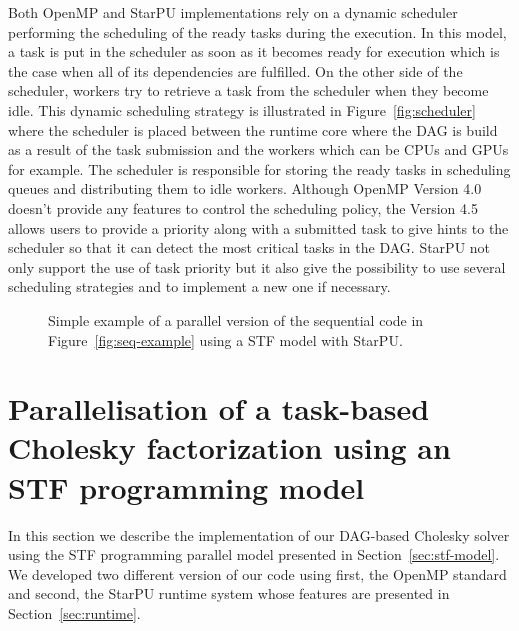\documentclass{article}
\newcommand{\starpu}{{StarPU}\xspace}
\newcommand{\openmp}{OpenMP\xspace}
\begin{document}
Both \openmp and \starpu implementations rely on a dynamic scheduler
performing the scheduling of the ready tasks during the execution. In
this model, a task is put in the scheduler as soon as it becomes ready
for execution which is the case when all of its dependencies are
fulfilled. On the other side of the scheduler, workers try to retrieve
a task from the scheduler when they become idle. This dynamic
scheduling strategy is illustrated in Figure~\ref{fig:scheduler} where
the scheduler is placed between the runtime core where the DAG is
build as a result of the task submission and the workers which can be
CPUs and GPUs for example. The scheduler is responsible for storing
the ready tasks in scheduling queues and distributing them to idle
workers. Although \openmp Version 4.0 doesn't provide any features to
control the scheduling policy, the Version 4.5 allows users to provide
a priority along with a submitted task to give hints to the scheduler
so that it can detect the most critical tasks in the DAG. \starpu not
only support the use of task priority but it also give the possibility
to use several scheduling strategies and to implement a new one if
necessary.

\begin{figure}[!h]
  \centering 
  \caption{\label{fig:stf-starpu-example}Simple example of a parallel version
    of the sequential code in Figure~\ref{fig:seq-example} using a STF
    model with \starpu.}
\end{figure}

\section{Parallelisation of a task-based Cholesky factorization using an STF programming model}
\label{sec:experiments}



In this section we describe the implementation of our DAG-based
Cholesky solver using the STF programming parallel model presented in
Section~\ref{sec:stf-model}. We developed two different version of our
code using first, the OpenMP standard and second, the StarPU runtime
system whose features are presented in Section~\ref{sec:runtime}.
\end{document}
